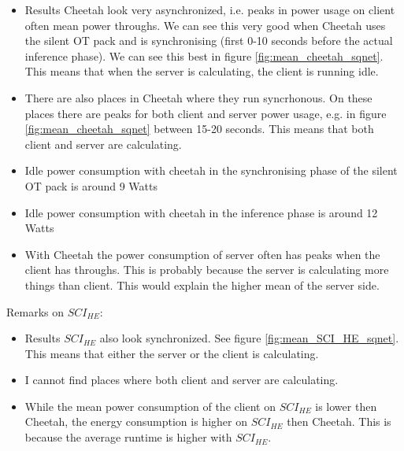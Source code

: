 \documentclass[../thesis.tex]{subfiles}
\begin{document}
\begin{itemize}
        \item Results Cheetah look very asynchronized, i.e. peaks in power usage on client often mean power throughs. We can see this very good when Cheetah uses the silent OT pack and is synchronising (first 0-10 seconds before the actual inference phase). We can see this best in figure \ref{fig:mean_cheetah_sqnet}. This means that when the server is calculating, the client is running idle.
        \item There are also places in Cheetah where they run syncrhonous. On these places there are peaks for both client and server power usage, e.g. in figure \ref{fig:mean_cheetah_sqnet} between 15-20 seconds. This means that both client and server are calculating.
        \item Idle power consumption with cheetah in the synchronising phase of the silent OT pack is around 9 Watts
        \item Idle power consumption with cheetah in the inference phase is around 12 Watts
        \item With Cheetah the power consumption of server often has peaks when the client has throughs. This is probably because the server is calculating more things than client. This would explain the higher mean of the server side. 
\end{itemize}
Remarks on $SCI_{HE}$:
\begin{itemize}
        \item Results $SCI_{HE}$ also look synchronized. See figure \ref{fig:mean_SCI_HE_sqnet}. This means that either the server or the client is calculating.
        \item I cannot find places where both client and server are calculating. 
        \item While the mean power consumption of the client on $SCI_{HE}$ is lower then Cheetah, the energy consumption is higher on $SCI_{HE}$ then Cheetah. This is because the average runtime is higher with $SCI_{HE}$.
\end{itemize}

     
\end{document}
